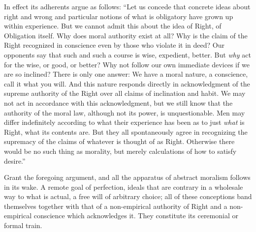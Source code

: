 
In effect its adherents argue as follows: ``Let us concede
that concrete ideas about right and wrong and particular notions of
what is obligatory have grown up within experience. But we cannot
admit this about the idea of Right, of Obligation itself. Why does
moral authority exist at all? Why is the claim of the Right recognized
in conscience even by those who violate it in deed? Our opponents say
that such and such a course is wise, expedient, better. But
\textit{why} act for the wise, or good, or better? Why not follow our
own immediate devices if we are so inclined? There is only one answer:
We have a moral nature, a conscience, call it what you will. And this
nature responds directly in acknowledgment of the supreme authority of
the Right over all claims of inclination and habit. We may not act in
accordance with this acknowledgment, but we still know that the
authority of the moral law, although not its power, is unquestionable.
Men may differ indefinitely according to what their experience has
been as to just \textit{what} is Right, what its contents are. But
they all spontaneously agree in recognizing the supremacy of the
claims of whatever is thought of as Right. Otherwise there would be no
such thing as morality, but merely calculations of how to satisfy
desire.''

Grant the foregoing argument, and all the apparatus of abstract
moralism follows in its wake. A remote goal of perfection, ideals that
are contrary in a wholesale way to what is actual, a free will of
arbitrary choice; all of these conceptions band themselves together
with that of a non-empirical authority of Right  and a
non-empirical conscience which acknowledges it. They constitute its
ceremonial or formal train.

